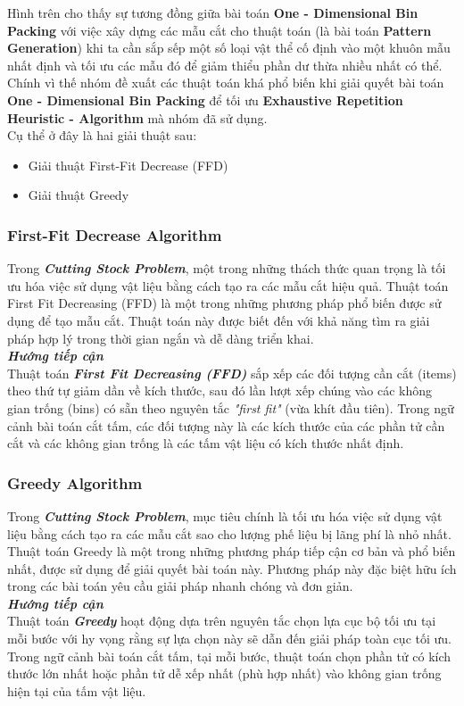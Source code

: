 \documentclass[a4paper]{article}
\begin{document}
\indent Hình trên cho thấy sự tương đồng giữa bài toán \textbf{One - Dimensional Bin Packing} với việc xây dựng các mẫu cắt cho thuật toán (là bài toán \textbf{Pattern Generation}) khi ta cần sắp sếp một số loại vật thể cố định vào một khuôn mẫu nhất định và tối ưu các mẫu đó để giảm thiểu phần dư thừa nhiều nhất có thể. Chính vì thế nhóm đề xuất các thuật toán khá phổ biến khi giải quyết bài toán \textbf{One - Dimensional Bin Packing} để tối ưu \textbf{Exhaustive Repetition Heuristic - Algorithm} mà nhóm đã sử dụng.\\
\indent Cụ thể ở đây là hai giải thuật sau:
\begin{itemize}
    \item Giải thuật First-Fit Decrease (FFD)
    \item Giải thuật Greedy
\end{itemize}
\subsubsection{First-Fit Decrease Algorithm}
\indent\indent Trong \textbf{\textit{Cutting Stock Problem}}, một trong những thách thức quan trọng là tối ưu hóa việc sử dụng vật liệu bằng cách tạo ra các mẫu cắt hiệu quả. Thuật toán First Fit Decreasing (FFD) là một trong những phương pháp phổ biến được sử dụng để tạo mẫu cắt. Thuật toán này được biết đến với khả năng tìm ra giải pháp hợp lý trong thời gian ngắn và dễ dàng triển khai.\\
\indent \textbf{\textit{Hướng tiếp cận}} \\
\indent Thuật toán \textbf{\textit{First Fit Decreasing (FFD)}} sắp xếp các đối tượng cần cắt (items) theo thứ tự giảm dần về kích thước, sau đó lần lượt xếp chúng vào các không gian trống (bins) có sẵn theo nguyên tắc \textit{"first fit"} (vừa khít đầu tiên). Trong ngữ cảnh bài toán cắt tấm, các đối tượng này là các kích thước của các phần tử cần cắt và các không gian trống là các tấm vật liệu có kích thước nhất định.
\subsubsection{Greedy Algorithm}
\indent\indent Trong \textbf{\textit{Cutting Stock Problem}}, mục tiêu chính là tối ưu hóa việc sử dụng vật liệu bằng cách tạo ra các mẫu cắt sao cho lượng phế liệu bị lãng phí là nhỏ nhất. Thuật toán Greedy là một trong những phương pháp tiếp cận cơ bản và phổ biến nhất, được sử dụng để giải quyết bài toán này. Phương pháp này đặc biệt hữu ích trong các bài toán yêu cầu giải pháp nhanh chóng và đơn giản.\\
\indent \textbf{\textit{Hướng tiếp cận}} \\
\indent Thuật toán \textbf{\textit{Greedy}} hoạt động dựa trên nguyên tắc chọn lựa cục bộ tối ưu tại mỗi bước với hy vọng rằng sự lựa chọn này sẽ dẫn đến giải pháp toàn cục tối ưu. Trong ngữ cảnh bài toán cắt tấm, tại mỗi bước, thuật toán chọn phần tử có kích thước lớn nhất hoặc phần tử dễ xếp nhất (phù hợp nhất) vào không gian trống hiện tại của tấm vật liệu.
\end{document}
